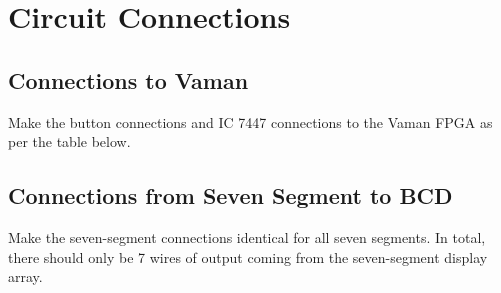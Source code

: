 \section{Circuit Connections}
\subsection{Connections to Vaman}
\raggedright
Make the button connections and IC 7447 connections to the Vaman FPGA as per the table below.\\
\vspace{0.25cm}


\subsection{Connections from Seven Segment to BCD}
\raggedright
Make the seven-segment connections identical for all seven segments. In total, there should only be 7 wires of output coming from the seven-segment display array.
\vspace{0.25cm}

